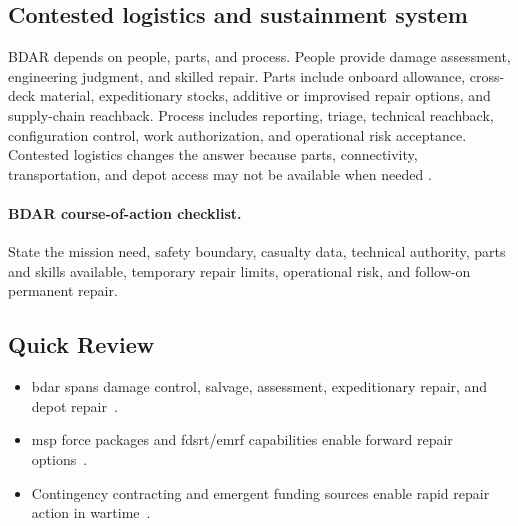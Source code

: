 \documentclass[../main.tex]{subfiles}
\begin{document}
\subsection{Contested logistics and sustainment system}

BDAR depends on people, parts, and process.  People provide damage assessment,
engineering judgment, and skilled repair.  Parts include onboard allowance,
cross-deck material, expeditionary stocks, additive or improvised repair
options, and supply-chain reachback.  Process includes reporting, triage,
technical reachback, configuration control, work authorization, and operational
risk acceptance.  Contested logistics changes the answer because parts,
connectivity, transportation, and depot access may not be available when needed
\autocite{edo-4-1-6-bdar-2025}.

\paragraph{BDAR course-of-action checklist.}
State the mission need, safety boundary, casualty data, technical authority,
parts and skills available, temporary repair limits, operational risk, and
follow-on permanent repair.

\subsection{Quick Review}
\begin{itemize}
  \item \ac{bdar} spans damage control, salvage, assessment, expeditionary repair, and depot repair~\autocite{edo-4-1-6-bdar-2025}.
  \item \ac{msp} force packages and \ac{fdsrt}/\ac{emrf} capabilities enable forward repair options~\autocite{edo-4-1-6-bdar-2025}.
  \item Contingency contracting and emergent funding sources enable rapid repair action in wartime~\autocite{edo-4-1-6-bdar-2025}.
\end{itemize}

\end{document}
